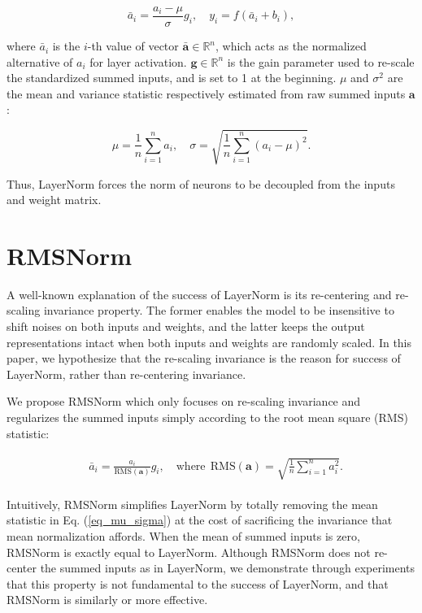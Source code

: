 \begin{equation}
    \bar{a}_i = \frac{a_i - \mu}{\sigma} g_i, \quad y_i = f\left(\bar{a}_i + b_i\right),
\end{equation}

where $\bar{a}_i$ is the $i$-th value of vector $\mathbf{\bar{a}} \in \mathbb{R}^n$, which acts as the normalized alternative of $a_i$ for layer activation. $\mathbf{g}\in\mathbb{R}^{n}$ is the gain parameter used to re-scale the standardized summed inputs, and is set to 1 at the beginning. $\mu$ and $\sigma^2$ are the mean and variance statistic respectively estimated from raw summed inputs $\mathbf{a}$:

\begin{equation}\label{eq_mu_sigma}
    \mu = \frac{1}{n}\sum_{i=1}^{n} a_i, \quad \sigma = \sqrt{\frac{1}{n}\sum_{i=1}^{n}(a_i - \mu)^2}.
\end{equation}

Thus, LayerNorm forces the norm of neurons to be decoupled from the inputs and weight matrix. 

\section{RMSNorm}

A well-known explanation of the success of LayerNorm is its re-centering and re-scaling invariance property. The former enables the model to be insensitive to shift noises on both inputs and weights, and the latter keeps the output representations intact when both inputs and weights are randomly scaled. In this paper, we hypothesize that the re-scaling invariance is the reason for success of LayerNorm, rather than re-centering invariance.

We propose RMSNorm which only focuses on re-scaling invariance and regularizes the summed inputs simply according to the root mean square (RMS) statistic:

\begin{align}\label{eq_rmsnorm}
    \begin{split}
        & \bar{a}_i = \frac{a_i}{\text{RMS}(\mathbf{a})} g_i, \quad \text{where}~~ \text{RMS}(\mathbf{a}) = \sqrt{\frac{1}{n} \sum_{i=1}^{n} a_i^2}.
    \end{split}
\end{align}

Intuitively, RMSNorm simplifies LayerNorm by totally removing the mean statistic in Eq. (\ref{eq_mu_sigma}) at the cost of sacrificing the invariance that mean normalization affords. When the mean of summed inputs is zero, RMSNorm is exactly equal to LayerNorm. Although RMSNorm does not re-center the summed inputs as in LayerNorm, we demonstrate through experiments that this property is not fundamental to the success of LayerNorm, and that RMSNorm is similarly or more effective.

